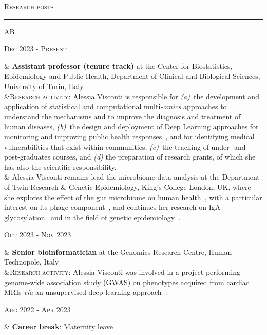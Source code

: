 \documentclass[a4paper,10pt]{article}
\newcommand{\mediumtitle}[1]{
	\vspace{0.2cm}
	{\noindent
	\Large \textsc{#1}\\[-2ex]
	\hrule
	\vspace{0.2cm}}
}
\newenvironment{doubletablelist}
{
	\vspace{-0.2cm}
	\begin{longtable}[!h]{AB}}{\end{longtable}
}
\newcommand{\dtlist}[2]{
\hspace{-3cm}
\noindent
	\begin{minipage}{0.22\textwidth}
	\begin{flushright}
	\textsc{#1}
	\end{flushright}
	\end{minipage}
	& #2\\[0.2cm]
}
\begin{document}
\newpage


\mediumtitle{Research posts}

\begin{doubletablelist}
	\dtlist{Dec 2023 - Present}{\textbf{Assistant professor (tenure track)} at the Center for Biostatistics, Epidemiology and Public Health, Department of Clinical and Biological Sciences, University of Turin, Italy \\	
	 &\textsc{Research activity}: Alessia Visconti is responsible for \emph{(a)}~the development and application of statistical and computational multi\emph{-omics} approaches to understand the mechanisms and to improve the diagnosis and treatment of human diseases, \emph{(b)}~the design and deployment of Deep Learning approaches for monitoring and improving public health responses~\cite{Con24}, and for identifying medical vulnerabilities that exist within communities, \emph{(c)}~the teaching of under- and post-graduates courses, and \emph{(d)} the preparation of research grants, of which she has also the scientific responsibility. \\
	 & Alessia Visconti remains lead the microbiome data analysis at the Department of Twin Research \& Genetic Epidemiology, King's College London, UK, where she explores the effect of the gut microbiome on human health~\cite{Dan24,Att24,Val24}, with a particular interest on its phage component~\cite{Kir24,Zol24}, and continues her research on IgA glycosylation~\cite{Vis24} and in the field of genetic epidemiology~\cite{Ros24}.
	}
	
	\dtlist{Oct 2023 - Nov 2023}{\textbf{Senior bioinformatician} at the Genomics Research Centre, Human Technopole, Italy \\	
	 &\textsc{Research activity}: Alessia Visconti was involved in a project performing genome-wide association study (GWAS) on phenotypes acquired from cardiac MRIs \emph{via} an unsupervised deep-learning approach~\cite{Ome24}.
	}
    
	  \dtlist{Aug 2022 - Apr 2023}{\textbf{Career break}: Maternity leave
	  }
	

\end{doubletablelist}
\end{document}
